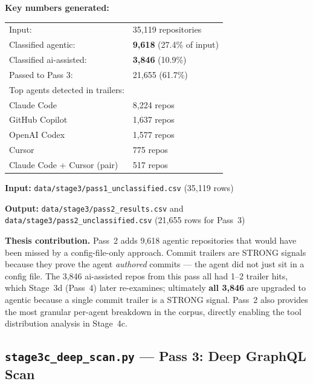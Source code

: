 \documentclass[11pt,a4paper]{article}
\begin{document}
\begin{numbersbox}
\textbf{Key numbers generated:}\\[2pt]
\begin{tabular}{@{}ll@{}}
Input:                           & 35,119 repositories \\
Classified agentic:              & \textbf{9,618} (27.4\% of input) \\
Classified ai-assisted:          & \textbf{3,846} (10.9\%) \\
Passed to Pass 3:                & 21,655 (61.7\%) \\[4pt]
Top agents detected in trailers: & \\
\quad Claude Code                & 8,224 repos \\
\quad GitHub Copilot             & 1,637 repos \\
\quad OpenAI Codex               & 1,577 repos \\
\quad Cursor                     & 775 repos \\
\quad Claude Code + Cursor (pair)& 517 repos \\
\end{tabular}
\end{numbersbox}

\textbf{Input:} \texttt{data/stage3/pass1\_unclassified.csv} (35,119 rows)

\textbf{Output:} \texttt{data/stage3/pass2\_results.csv} and
\texttt{data/stage3/pass2\_unclassified.csv} (21,655 rows for Pass~3)

\begin{outputbox}
\textbf{Thesis contribution.}
Pass~2 adds 9,618 agentic repositories that would have been missed by a
config-file-only approach. Commit trailers are STRONG signals because they
prove the agent \emph{authored} commits --- the agent did not just sit in a
config file. The 3,846 ai-assisted repos from this pass all had 1--2 trailer
hits, which Stage~3d (Pass~4) later re-examines; ultimately \textbf{all
3,846} are upgraded to agentic because a single commit trailer is a STRONG
signal. Pass~2 also provides the most granular per-agent breakdown in the
corpus, directly enabling the tool distribution analysis in Stage~4c.
\end{outputbox}

\newpage

\subsection*{\texttt{stage3c\_deep\_scan.py} --- Pass 3: Deep GraphQL Scan}
\end{document}
